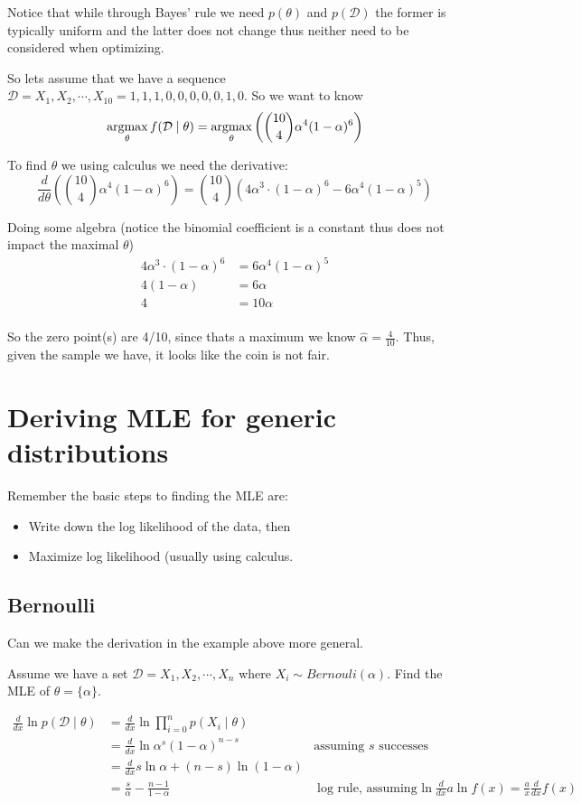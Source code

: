Notice that while through Bayes' rule we need $p(\theta)$ and $p(\mathcal{D})$ 
the former is typically uniform and the latter does not change thus neither need to be considered when optimizing. 

So lets assume that we have a sequence $\mathcal{D} = X_1, X_2, \cdots, X_{10} = 1,1,1,0,0,0,0,0,1,0$.
So we want to know 
\[\operatorname*{argmax}_\theta f(\mathcal{D}\mid\theta) = \operatorname*{argmax}_\theta \left({10 \choose 4} \alpha^4(1-\alpha)^6\right)\]

To find $\theta$ we using calculus we need the derivative: 
\[\frac{d}{d\theta}\left({10 \choose 4} \alpha^4(1-\alpha)^6\right) = {10 \choose 4}\left(4\alpha^3\cdot(1-\alpha)^6-6\alpha^4(1-\alpha)^5\right)\]

Doing some algebra (notice the binomial coefficient is a constant thus does not impact the maximal $\theta$)
\begin{align*}
4\alpha^3\cdot(1-\alpha)^6&=6\alpha^4(1-\alpha)^5\\
4(1-\alpha) &= 6\alpha\\
4 &= 10\alpha\\
\end{align*}

So the zero point(s) are 4/10, since thats a maximum we know $\hat{\alpha} = \frac{4}{10}$.
Thus, given the sample we have, it looks like the coin is not fair. 

\section{Deriving MLE for generic distributions}
Remember the basic steps to finding the MLE are: 
\begin{itemize}
\item Write down the log likelihood of the data, then
\item Maximize log likelihood (usually using calculus. 
\end{itemize}

\subsection{Bernoulli}

Can we make the derivation in the example above more general. 

Assume we have a set $\mathcal{D} = X_1, X_2, \cdots, X_n$ 
where $X_i \sim Bernouli(\alpha)$.
Find the MLE of $\theta=\{\alpha\}$.

\begin{align*}
\frac{d}{dx} \ln p(\mathcal{D}\mid\theta) 	&= \frac{d}{dx} \ln \prod_{i=0}^n p(X_i\mid\theta)\\
					    		     	&= \frac{d}{dx} \ln \alpha^s(1-\alpha)^{n-s} & \text{assuming $s$ successes}\\
					    			& = \frac{d}{dx} s \ln \alpha + (n-s) \ln (1-\alpha)\\
								& = \frac{s}{\alpha} - \frac{n-1}{1-\alpha} 		& \text{log rule, assuming $\ln$} \frac{d}{dx} a \ln f(x) = \frac{a}{x} \frac{d}{dx}  f(x)			     
\end{align*}

